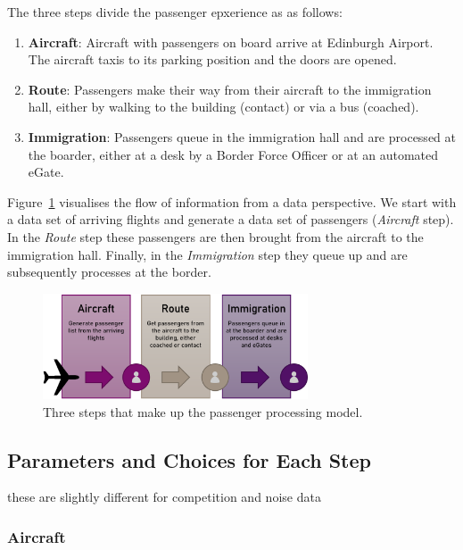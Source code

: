 \documentclass[10pt]{article}
\begin{document}
The three steps divide the passenger epxerience as as follows:
\begin{enumerate}
    \item \textbf{Aircraft}: Aircraft with passengers on board arrive at Edinburgh Airport. The aircraft taxis to its parking position and the doors are opened. \label{step:aircraft}
    \item \textbf{Route}: Passengers make their way from their aircraft to the immigration hall, either by walking to the building (contact) or via a bus (coached). \label{step:route}
    \item \textbf{Immigration}: Passengers queue in the immigration hall and are processed at the boarder, either at a desk by a Border Force Officer or at an automated eGate. \label{step:immigration}
\end{enumerate}

 Figure~\ref{PPM_threesteps} visualises the flow of information from a data perspective. We start with a data set of arriving flights and generate a data set of passengers (\textit{Aircraft} step). In the \textit{Route} step these passengers are then brought from the aircraft to the immigration hall. Finally, in the \textit{Immigration} step they queue up and are subsequently processes at the border.

\begin{figure}[!ht]
    \centering
    \includegraphics[width=0.7\textwidth]{figures/ThreeSteps.png}
     \caption{Three steps that make up the passenger processing model.  } \label{PPM_threesteps}
\end{figure}

\subsection{Parameters and Choices for Each Step}
these are slightly different for competition and noise data

\subsubsection{Aircraft}
\end{document}
